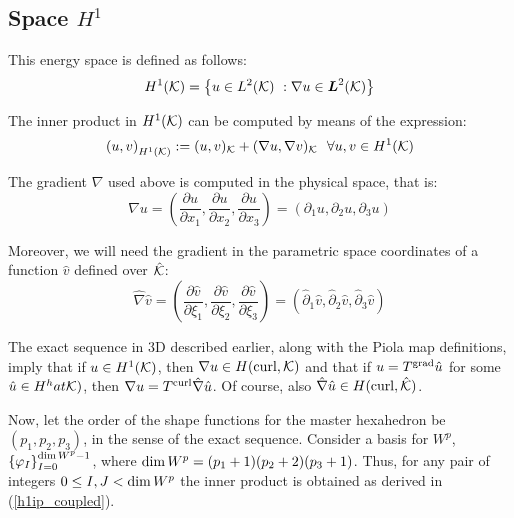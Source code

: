 \subsection{Space \texorpdfstring{$H^1$}{H1}}

This energy space is defined as follows:
% 
\begin{equation}
    H^1(\mathcal{K})=\left\{ u\in L^2(\mathcal{K})\ :\nabla u\in\boldsymbol{L}^2(\mathcal{K})\right\}
\end{equation}

\noindent The inner product in $H^1(\mathcal{K})$ can be computed by means of the expression:
% 
\begin{equation}
    \left(u,v\right)_{H^1(\mathcal{K})}:=(u,v)_{\mathcal{K}}+(\nabla u,\nabla v)_{\mathcal{K}}\ \ \forall u,v\in H^1(\mathcal{K})
\end{equation}

\noindent The gradient $\nabla$ used above is computed in the physical space, that is: 
% 
\begin{equation}
    \nabla u=\left(\frac{\partial u}{\partial x_1},\frac{\partial u}{\partial x_2},\frac{\partial u}{\partial x_3}\right) =\left(\partial_1 u,\partial_2 u, \partial_3 u\right)
\end{equation}

\noindent Moreover, we will need the gradient in the parametric space coordinates of a function $\hat{v}$ defined over $\hat{\mathcal{K}}$:
% 
\begin{equation}
    \hat{\nabla} \hat{v}=\left(\frac{\partial \hat{v}}{\partial\xi_1},\frac{\partial \hat{v}}{\partial\xi_2},\frac{\partial \hat{v}}{\partial\xi_3}\right) =\left(\hat{\partial}_1 \hat{v},\hat{\partial}_2 \hat{v}, \hat{\partial}_3 \hat{v}\right)
\end{equation}

The exact sequence in 3D described earlier, along with the Piola map definitions, imply that if $u\in H^1(\mathcal{K})$, then $\nabla u\in H(\operatorname{curl},\mathcal{K})$ and that if $u=T^{\operatorname{grad}}\hat{u}$ for some $\hat{u}\in H^hat\mathcal{K})$, then $\nabla u=T^{\operatorname{curl}}\hat{\nabla}\hat{u}$. Of course, also $\hat{\nabla}\hat{u}\in H(\operatorname{curl},\hat{\mathcal{K}})$.

Now, let the order of the shape functions for the master hexahedron be $(p_1,p_2,p_3)$, in the sense of the exact sequence. Consider a basis for $W^p$, $\left\{ \varphi_I \right\}_{I=0}^{\operatorname*{dim} W^p-1}$, where $\operatorname*{dim} W^p=(p_1+1)(p_2+2)(p_3+1)$. Thus, for any pair of integers $0\leq I,J<\operatorname*{dim} W^p$ the inner product is obtained as derived in (\ref{h1ip_coupled}).

